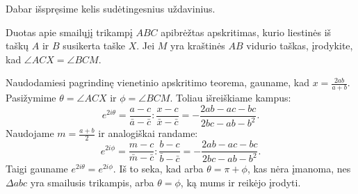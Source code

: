 \documentclass[11pt,a4paper,twoside]{book}
\begin{document}
Dabar išspręsime kelis sudėtingesnius uždavinius.







\begin{pavnr} 
Duotas apie smailųjį trikampį $ABC$ apibrėžtas apskritimas, kurio liestinės iš taškų $A$ ir $B$ susikerta taške $X$. Jei $M$ yra kraštinės $AB$ vidurio taškas, įrodykite, kad $\angle ACX = \angle BCM$.
\end{pavnr}
\begin{sprendimas}
Naudodamiesi pagrindinę vienetinio apskritimo teorema, gauname, kad $ x= \frac {2ab}{a+b}$. Pasižymime $\theta = \angle ACX$ ir $\phi = \angle BCM$. Toliau išreiškiame kampus:
$$ e^{ 2i\theta} = \frac { a-c}{ \bar a - \bar c} : \frac {x-c}{\bar x - \bar c}=
- \frac { 2ab -ac-bc}{2bc - ab- b^2}.$$
Naudojame $m = \frac {a+b}{2}$ ir analogiškai randame:
$$ e^{2i\phi} = \frac { m-c}{ \bar m - \bar c} : \frac {b-c}{\bar b - \bar c}=
- \frac { 2ab -ac-bc}{2bc - ab- b^2}.$$
Taigi gauname $ e^{ 2i\theta} = e^{2i\phi}$. Iš to seka, kad arba $ \theta = \pi + \phi$, kas nėra įmanoma, nes $\Delta abc$ yra smailusis trikampis, arba $\theta =\phi$, ką mums ir reikėjo įrodyti.

\end{sprendimas}
\end{document}
